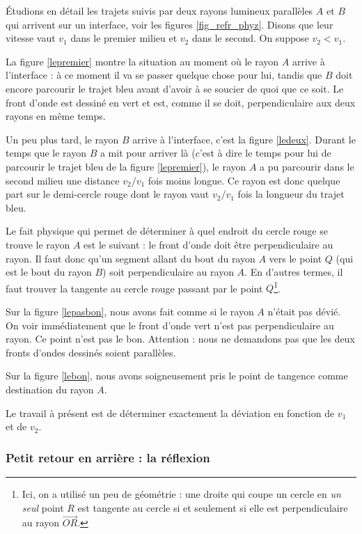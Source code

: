 \documentclass[a4paper,12pt]{book}
\theoremstyle{mes_exemples}	\newtheorem{exemple}[numtho]{Exemple}
\theoremstyle{mes_tho}
\begin{document}
Étudions en détail les trajets suivis par deux rayons lumineux parallèles $A$ et $B$ qui arrivent sur un interface, voir les figures \ref{fig_refr_phyz}. Disons que leur vitesse vaut $v_{1}$ dans le premier milieu et $v_{2}$ dans le second. On suppose $v_{2}<v_{1}$. 

La figure \ref{lepremier} montre la situation au moment où le rayon $A$ arrive à l'interface : à ce moment il va se passer quelque chose pour lui, tandis que $B$ doit encore parcourir le trajet bleu avant d'avoir à se soucier de quoi que ce soit. Le front d'onde est dessiné en vert et est, comme il se doit, perpendiculaire aux deux rayons en même temps.

Un peu plus tard, le rayon $B$ arrive à l'interface, c'est la figure \ref{ledeux}. Durant le temps que le rayon $B$ a mit pour arriver là (c'est à dire le temps pour lui de parcourir le trajet bleu de la figure \ref{lepremier}), le rayon $A$ a pu parcourir dans le second milieu une distance $v_{2}/v_{1}$ fois moins longue. Ce rayon est donc quelque part sur le demi-cercle rouge dont le rayon vaut $v_{2}/v_{1}$ fois la longueur du trajet bleu.

Le fait physique qui permet de déterminer à quel endroit du cercle rouge se trouve le rayon $A$ est le suivant : le front d'onde doit être perpendiculaire au rayon. Il faut donc qu'un segment allant du bout du rayon $A$ vers le point $Q$ (qui est le bout du rayon $B$) soit perpendiculaire au rayon $A$. En d'autres termes, il faut trouver la tangente au cercle rouge passant par le point $Q$\footnote{Ici, on a utilisé un peu de géométrie : une droite qui coupe un cercle en \emph{un seul} point $R$ est tangente au cercle si et seulement si elle est perpendiculaire au rayon $\overrightarrow{OR}$.}.

Sur la figure \ref{lepasbon}, nous avons fait comme si le rayon $A$ n'était pas dévié. On voir immédiatement que le front d'onde vert n'est pas perpendiculaire au rayon. Ce point n'est pas le bon. Attention : nous ne demandons pas que les deux fronts d'ondes dessinés soient parallèles.

Sur la figure \ref{lebon}, nous avons soigneusement pris le point de tangence comme destination du rayon $A$.


Le travail à présent est de déterminer exactement la déviation en fonction de $v_{1}$ et de $v_{2}$.

\subsubsection{Petit retour en arrière : la réflexion}
\end{document}
